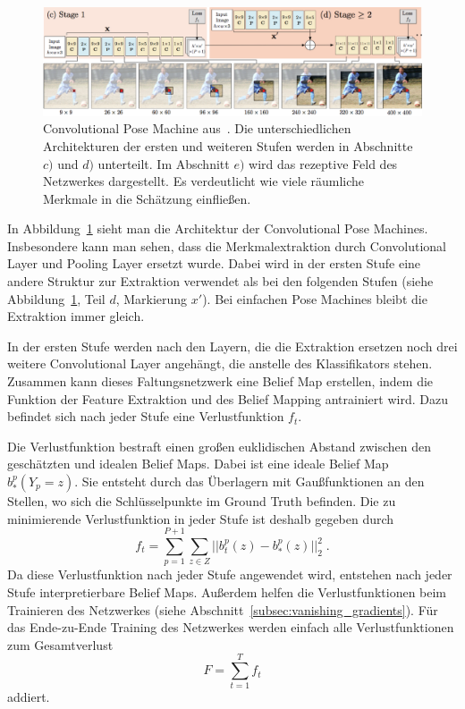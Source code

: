 \documentclass[journal, a4paper]{IEEEtran}
\begin{document}
        \begin{figure}[!bth]
                \begin{center}
                \includegraphics[width=1\columnwidth]{convolutional_pose_machine.png}
                \caption{Convolutional Pose Machine aus~\cite{conv_pose}. Die unterschiedlichen Architekturen der ersten und weiteren Stufen werden in Abschnitte $c)$ und $d)$ unterteilt. Im Abschnitt $e)$ wird das rezeptive Feld des Netzwerkes dargestellt. Es verdeutlicht wie viele räumliche Merkmale in die Schätzung einfließen.}
                \label{fig:conv_pose_machine}
                \end{center}
        \end{figure}

        In Abbildung~\ref{fig:conv_pose_machine} sieht man die Architektur der Convolutional Pose Machines. Insbesondere kann man sehen, dass die Merkmalextraktion durch Convolutional Layer und Pooling Layer ersetzt wurde. Dabei wird in der ersten Stufe eine andere Struktur zur Extraktion verwendet als bei den folgenden Stufen (siehe Abbildung~\ref{fig:conv_pose_machine}, Teil $d$, Markierung $x'$). Bei einfachen Pose Machines bleibt die Extraktion immer gleich. 

        In der ersten Stufe werden nach den Layern, die die Extraktion ersetzen noch drei weitere Convolutional Layer angehängt, die anstelle des Klassifikators stehen. Zusammen kann dieses Faltungsnetzwerk eine Belief Map erstellen, indem die Funktion der Feature Extraktion und des Belief Mapping antrainiert wird. Dazu befindet sich nach jeder Stufe eine Verlustfunktion $f_{t}$.

        Die Verlustfunktion bestraft einen großen euklidischen Abstand zwischen den geschätzten und idealen Belief Maps. Dabei ist eine ideale Belief Map $b_{*}^{p}(Y_p = z)$. Sie entsteht durch das Überlagern mit Gaußfunktionen an den Stellen, wo sich die Schlüsselpunkte im Ground Truth befinden. %
        Die zu minimierende Verlustfunktion in jeder Stufe ist deshalb gegeben durch
        \[ f_t = \sum_{p=1}^{P+1} \sum_{z \in Z} ||b_{t}^{p}(z) - b_{*}^{p}(z) ||_{2}^{2} \; .\]
        Da diese Verlustfunktion nach jeder Stufe angewendet wird, entstehen nach jeder Stufe interpretierbare Belief Maps. Außerdem helfen die Verlustfunktionen beim Trainieren des Netzwerkes (siehe Abschnitt~\ref{subsec:vanishing_gradients}). Für das Ende-zu-Ende Training des Netzwerkes werden einfach alle Verlustfunktionen zum Gesamtverlust
        \[ F = \sum_{t=1}^{T} f_t \]
        addiert.
\end{document}
